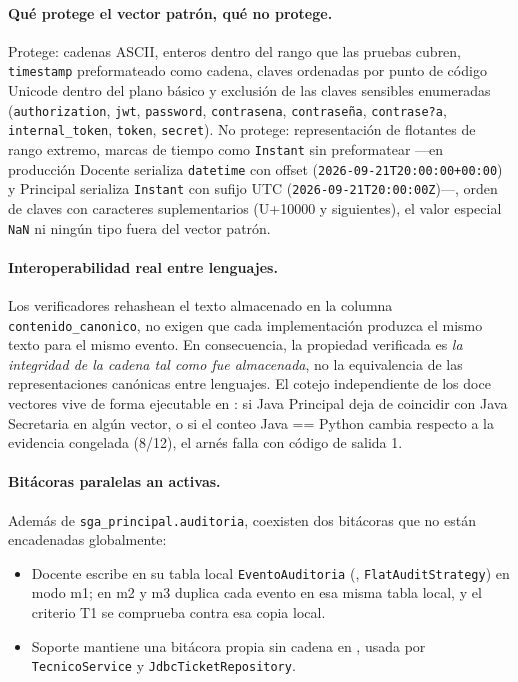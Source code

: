 \documentclass[11pt,a4paper]{article}
\begin{document}
\paragraph{Qu\'e protege el vector patr\'on, qu\'e no protege.}
Protege: cadenas ASCII, enteros dentro del rango que las pruebas cubren,
\texttt{timestamp} preformateado como cadena, claves ordenadas por punto
de c\'odigo Unicode dentro del plano b\'asico y exclusi\'on de las claves
sensibles enumeradas (\texttt{authorization}, \texttt{jwt},
\texttt{password}, \texttt{contrasena}, \texttt{contrase\~na},
\texttt{contrase?a}, \texttt{internal\_token}, \texttt{token},
\texttt{secret}). No protege: representaci\'on de flotantes de rango
extremo, marcas de tiempo como \texttt{Instant} sin preformatear ---en
producci\'on Docente serializa \texttt{datetime} con offset
(\texttt{2026-09-21T20:00:00+00:00}) y Principal serializa
\texttt{Instant} con sufijo UTC (\texttt{2026-09-21T20:00:00Z})---,
orden de claves con caracteres suplementarios (U+10000 y siguientes), el
valor especial \texttt{NaN} ni ning\'un tipo fuera del vector patr\'on.

\paragraph{Interoperabilidad real entre lenguajes.}
Los verificadores rehashean el texto almacenado en la columna
\texttt{contenido\_canonico}, no exigen que cada implementaci\'on
produzca el mismo texto para el mismo evento. En consecuencia, la
propiedad verificada es \textit{la integridad de la cadena tal como fue
almacenada}, no la equivalencia de las representaciones can\'onicas
entre lenguajes. El cotejo independiente de los doce vectores vive de
forma ejecutable en : si Java
Principal deja de coincidir con Java Secretaria en alg\'un vector, o si
el conteo Java == Python cambia respecto a la evidencia congelada
(8/12), el arn\'es falla con c\'odigo de salida 1.

\paragraph{Bit\'acoras paralelas an activas.}
Adem\'as de \texttt{sga\_principal.auditoria}, coexisten dos bit\'acoras
que no est\'an encadenadas globalmente:
\begin{itemize}
  \item Docente escribe en su tabla local \texttt{EventoAuditoria}
        (, \texttt{FlatAuditStrategy})
        en modo m1; en m2 y m3 duplica cada evento en esa misma tabla
        local, y el criterio T1 se comprueba contra esa copia local.
  \item Soporte mantiene una bit\'acora propia sin cadena en
        , usada por
        \texttt{TecnicoService} y \texttt{JdbcTicketRepository}.
\end{itemize}
\end{document}
